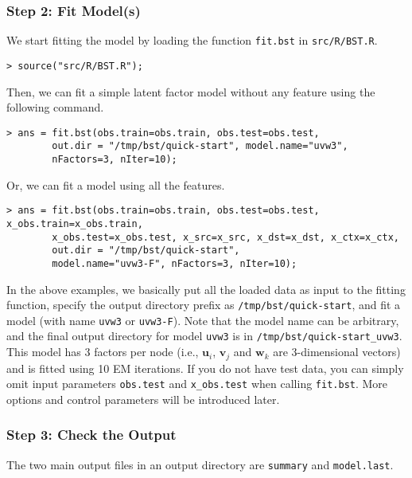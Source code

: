 \subsubsection{Step 2: Fit Model(s)}
We start fitting the model by loading the function {\tt fit.bst} in {\tt src/R/BST.R}. 
{\small\begin{verbatim}
> source("src/R/BST.R");
\end{verbatim}}
\noindent Then, we can fit a simple latent factor model without any feature using the following command.
{\small\begin{verbatim}
> ans = fit.bst(obs.train=obs.train, obs.test=obs.test, 
        out.dir = "/tmp/bst/quick-start", model.name="uvw3", 
        nFactors=3, nIter=10);
\end{verbatim}}
\noindent Or, we can fit a model using all the features.
{\small\begin{verbatim}
> ans = fit.bst(obs.train=obs.train, obs.test=obs.test, x_obs.train=x_obs.train, 
        x_obs.test=x_obs.test, x_src=x_src, x_dst=x_dst, x_ctx=x_ctx,
        out.dir = "/tmp/bst/quick-start", 
        model.name="uvw3-F", nFactors=3, nIter=10);
\end{verbatim}}
In the above examples, we basically put all the loaded data as input to the fitting function, specify the output directory prefix as {\tt /tmp/bst/quick-start}, and fit a model (with name {\tt uvw3} or {\tt uvw3-F}). Note that the model name can be arbitrary, and the final output directory for model {\tt uvw3} is in {\tt /tmp/bst/quick-start\_uvw3}.  This model has 3 factors per node (i.e., $\bm{u}_i$, $\bm{v}_j$ and $\bm{w}_k$ are 3-dimensional vectors) and is fitted using 10 EM iterations.  
If you do not have test data, you can simply omit input parameters {\tt obs.test} and {\tt x\_obs.test} when calling {\tt fit.bst}.
More options and control parameters will be introduced later.

\subsubsection{Step 3: Check the Output}
\label{sec:model-output}

The two main output files in an output directory are {\tt summary} and {\tt model.last}.

